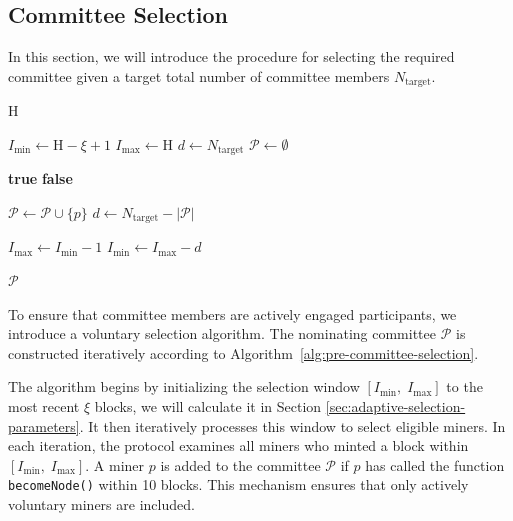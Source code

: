\documentclass[journal]{IEEEtran}
\begin{document}
\subsection{Committee Selection}
In this section, we will introduce the procedure for selecting the required committee given a target total number of committee members $N_{\text{target}}$.
\label{sec:committee-selection}
\begin{algorithm}[ht]
\caption{Nominating committee Construction Algorithm}
\label{alg:pre-committee-selection}
\begin{algorithmic}[1]
\Require $\mathrm{H}$ 

\State $I_{\min} \gets \mathrm{H} - \xi + 1 $
\State$I_{\max} \gets \mathrm{H}$ 
\State $d \gets N_{\text{target}}$ 
\State $\mathcal{P} \gets \emptyset$ 

        \State \Return \textbf{true}
    \EndIf
    \State \Return \textbf{false}
\EndFunction

            \State $\mathcal{P} \gets \mathcal{P} \cup \{p\}$ 
        \EndIf
    \EndFor
    \State $d \gets N_{\text{target}} - |\mathcal{P}|$ 
    
    \State $I_{\max} \gets I_{\min} - 1$
    \State $ I_{\min} \gets I_{\max} -d$
\EndWhile

\State \Return $\mathcal{P}$ 
\EndFunction
\end{algorithmic}
\end{algorithm}

To ensure that committee members are actively engaged participants, we introduce a voluntary selection algorithm. The nominating committee $\mathcal{P}$ is constructed iteratively according to Algorithm~\ref{alg:pre-committee-selection}.

The algorithm begins by initializing the selection window $[I_{\min},\;  I_{\max}]$ to the most recent $\xi$ blocks, we will calculate it in Section \ref{sec:adaptive-selection-parameters}. It then iteratively processes this window to select eligible miners. In each iteration, the protocol examines all miners who minted a block within $[I_{\min},\;  I_{\max}]$. A miner $p$ is added to the committee $\mathcal{P}$ if $p$ has called the function \texttt{becomeNode()} within 10 blocks. This mechanism ensures that only actively voluntary miners are included.
\end{document}
